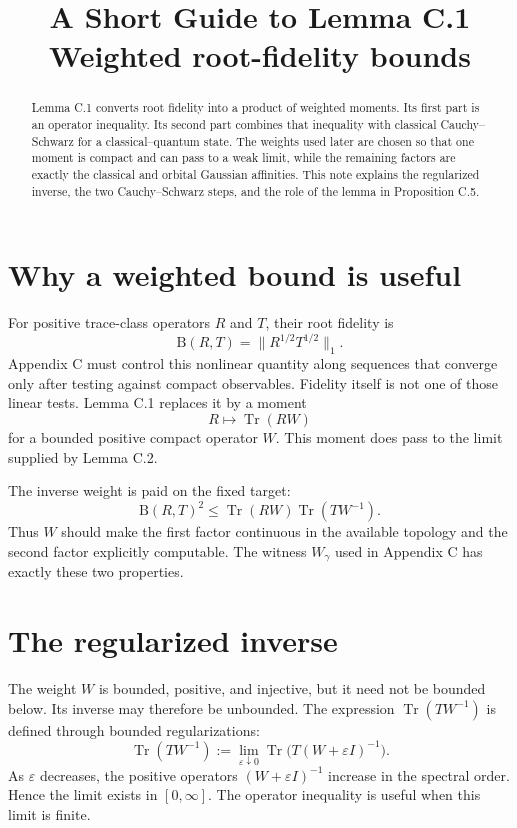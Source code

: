 \documentclass[11pt]{article}
\title{A Short Guide to Lemma C.1\\
\large Weighted root-fidelity bounds}
\author{}
\date{}
\newcommand{\Tr}{\operatorname{Tr}}
\newcommand{\B}{\mathrm B}
\begin{document}
\maketitle

\begin{abstract}
Lemma C.1 converts root fidelity into a product of weighted moments.  Its
first part is an operator inequality.  Its second part combines that
inequality with classical Cauchy--Schwarz for a classical--quantum state.
The weights used later are chosen so that one moment is compact and can pass
to a weak limit, while the remaining factors are exactly the classical and
orbital Gaussian affinities.  This note explains the regularized inverse,
the two Cauchy--Schwarz steps, and the role of the lemma in Proposition C.5.
\end{abstract}

\section{Why a weighted bound is useful}

For positive trace-class operators $R$ and $T$, their root fidelity is
\[
  \B(R,T)=\|R^{1/2}T^{1/2}\|_1.
\]
Appendix C must control this nonlinear quantity along sequences that converge
only after testing against compact observables.  Fidelity itself is not one
of those linear tests.  Lemma C.1 replaces it by a moment
\[
  R\longmapsto\Tr(RW)
\]
for a bounded positive compact operator $W$.  This moment does pass to the
limit supplied by Lemma C.2.

The inverse weight is paid on the fixed target:
\[
  \B(R,T)^2
  \leq \Tr(RW)\Tr(TW^{-1}).
\]
Thus $W$ should make the first factor continuous in the available topology
and the second factor explicitly computable.  The witness $W_\gamma$ used in
Appendix C has exactly these two properties.

\section{The regularized inverse}

The weight $W$ is bounded, positive, and injective, but it need not be
bounded below.  Its inverse may therefore be unbounded.  The expression
$\Tr(TW^{-1})$ is defined through bounded regularizations:
\begin{equation}\label{eq:inverse-definition}
  \Tr(TW^{-1})
  :=\lim_{\varepsilon\downarrow0}
  \Tr\bigl(T(W+\varepsilon I)^{-1}\bigr).
\end{equation}
As $\varepsilon$ decreases, the positive operators
$(W+\varepsilon I)^{-1}$ increase in the spectral order.  Hence the limit
exists in $[0,\infty]$.  The operator inequality is useful when this limit is
finite.
\end{document}
